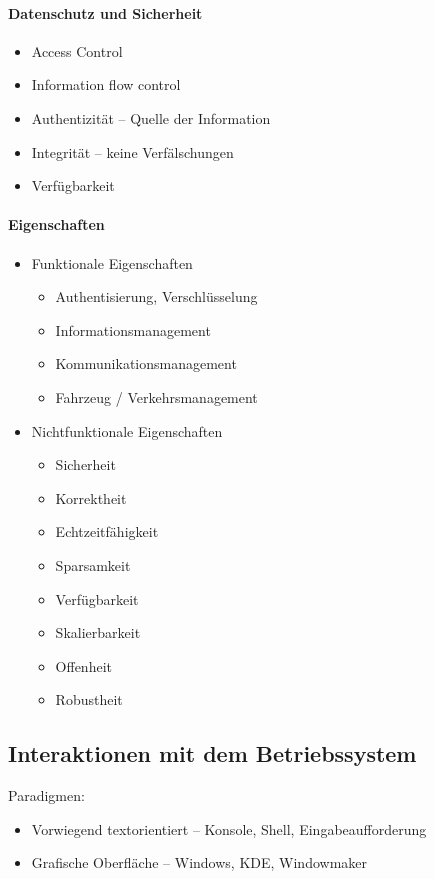 \documentclass[a4paper,12pt]{article}
\begin{document}
\paragraph{Datenschutz und Sicherheit}
\begin{itemize}
\item Access Control
\item Information flow control
\item Authentizität -- Quelle der Information
\item Integrität -- keine Verfälschungen
\item Verfügbarkeit
\end{itemize}

\paragraph{Eigenschaften}
\begin{itemize}
\item Funktionale Eigenschaften
    \begin{itemize}
    \item Authentisierung, Verschlüsselung
    \item Informationsmanagement
    \item Kommunikationsmanagement
    \item Fahrzeug / Verkehrsmanagement
    \end{itemize}
\item Nichtfunktionale Eigenschaften
    \begin{itemize}
    \item Sicherheit
    \item Korrektheit
    \item Echtzeitfähigkeit
    \item Sparsamkeit
    \item Verfügbarkeit
    \item Skalierbarkeit
    \item Offenheit
    \item Robustheit
    \end{itemize}
\end{itemize}

\subsection{Interaktionen mit dem Betriebssystem}
Paradigmen:
\begin{itemize}
\item Vorwiegend textorientiert -- Konsole, Shell, Eingabeaufforderung
\item Grafische Oberfläche -- Windows, KDE, Windowmaker
\end{itemize}
\end{document}
